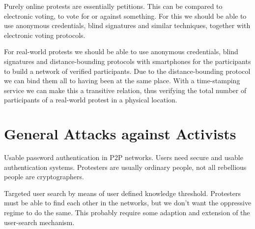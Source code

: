 \documentclass[a4paper]{llncs}
\begin{document}
Purely online protests are essentially petitions.
This can be compared to electronic voting, to vote for or against something.
For this we should be able to use anonymous credentials, blind signatures and 
similar techniques, together with electronic voting protocols.

For real-world protests we should be able to use anonymous credentials, blind 
signatures and distance-bounding protocols with smartphones for the 
participants to build a network of verified participants.
Due to the distance-bounding protocol we can bind them all to having been at 
the same place.
With a time-stamping service we can make this a transitive relation, thus 
verifying the total number of participants of a real-world protest in 
a physical location.


\section{General Attacks against Activists}

Usable password authentication in \ac{P2P} networks.
Users need secure and usable authentication systems.
Protesters are usually ordinary people, not all rebellious people are 
cryptographers.

Targeted user search by means of user defined knowledge threshold.
Protesters must be able to find each other in the networks, but we don't want 
the oppressive regime to do the same.
This probably require some adaption and extension of the user-search mechanism.


\printbibliography{}
\end{document}
